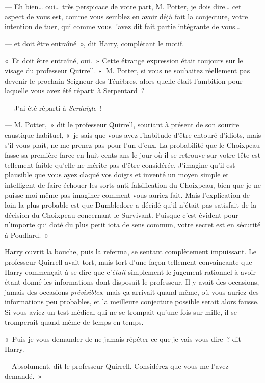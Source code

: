 --- Eh bien… oui… très perspicace de votre part, M. Potter, je dois dire… cet aspect de vous est, comme vous semblez en avoir déjà fait la conjecture, votre intention de tuer, qui comme vous l'avez dit fait partie intégrante de vous…

--- et doit être entraîné~», dit Harry, complétant le motif.

«~Et doit être entraîné, oui.~»
Cette étrange expression était toujours sur le visage du professeur Quirrell.
«~M. Potter, si vous ne souhaitez réellement pas devenir le prochain Seigneur des Ténèbres, alors quelle était l'ambition pour laquelle vous avez été réparti à Serpentard~?

--- J'ai été réparti à \emph{Serdaigle}~!

--- M. Potter,~» dit le professeur Quirrell, souriant à présent de son sourire caustique habituel, «~je sais que vous avez l'habitude d'être entouré d'idiots, mais s'il vous plaît, ne me prenez pas pour l'un d'eux.
La probabilité que le Choixpeau fasse sa première farce en huit cents ans le jour où il se retrouve sur votre tête est tellement faible qu'elle ne mérite pas d'être considérée.
J'imagine qu'il est plausible que vous ayez claqué vos doigts et inventé un moyen simple et intelligent de faire échouer les sorts anti-falsification du Choixpeau, bien que je ne puisse moi-même pas imaginer comment vous auriez fait.
Mais l'explication de loin la plus probable est que Dumbledore a décidé qu'il n'était pas satisfait de la décision du Choixpeau concernant le Survivant.
Puisque c'est évident pour n'importe qui doté du plus petit iota de sens commun, votre secret est en sécurité à Poudlard.~»

Harry ouvrit la bouche, puis la referma, se sentant complètement impuissant.
Le professeur Quirrell avait tort, mais tort d'une façon tellement convaincante que Harry commençait à se dire que c'\emph{était} simplement le jugement rationnel à avoir étant donné les informations dont disposait le professeur.
Il y avait des occasions, jamais des occasions \emph{prévisibles}, mais ça arrivait quand même, où vous auriez des informations peu probables, et la meilleure conjecture possible serait alors fausse.
Si vous aviez un test médical qui ne se trompait qu'une fois sur mille, il se tromperait quand même de temps en temps.

«~Puis-je vous demander de ne jamais répéter ce que je vais vous dire~? dit Harry.

---Absolument, dit le professeur Quirrell.
Considérez que vous me l'avez demandé.~»

